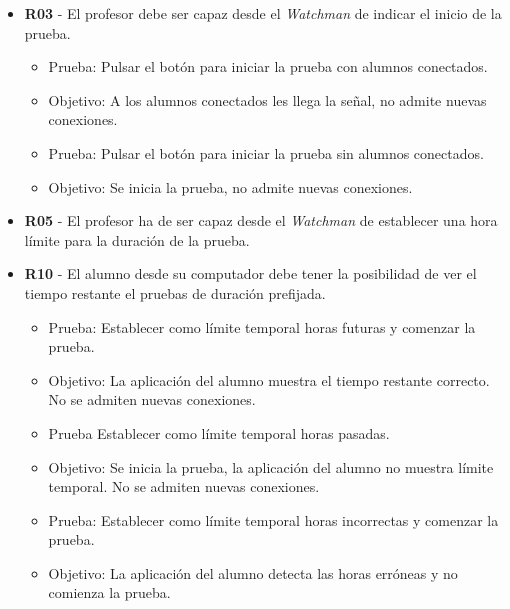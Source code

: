 \begin{itemize}

    \item {\bfseries R03} - El profesor debe ser capaz desde el \emph{Watchman} de indicar el inicio de la prueba.

    \begin{itemize}

        \item Prueba: Pulsar el botón para iniciar la prueba con alumnos conectados.
        \item Objetivo: A los alumnos conectados les llega la señal, no admite nuevas conexiones.

        \item Prueba: Pulsar el botón para iniciar la prueba sin alumnos conectados.
        \item Objetivo: Se inicia la prueba, no admite nuevas conexiones.

    \end{itemize}

    \item {\bfseries R05} - El profesor ha de ser capaz desde el \emph{Watchman} de establecer una hora límite para la duración de la prueba.

    \item {\bfseries R10} - El alumno desde su computador debe tener la posibilidad de ver el tiempo restante el pruebas de duración prefijada.

    \begin{itemize}
        \item Prueba: Establecer como límite temporal horas futuras y comenzar la prueba.
        \item Objetivo: La aplicación del alumno muestra el tiempo restante correcto. No se admiten nuevas conexiones.

        \item Prueba Establecer como límite temporal horas pasadas.
        \item Objetivo: Se inicia la prueba, la aplicación del alumno no muestra límite temporal. No se admiten nuevas conexiones.

        \item Prueba: Establecer como límite temporal horas incorrectas y comenzar la prueba.
        \item Objetivo: La aplicación del alumno detecta las horas erróneas y no comienza la prueba.
    \end{itemize}



\end{itemize}

